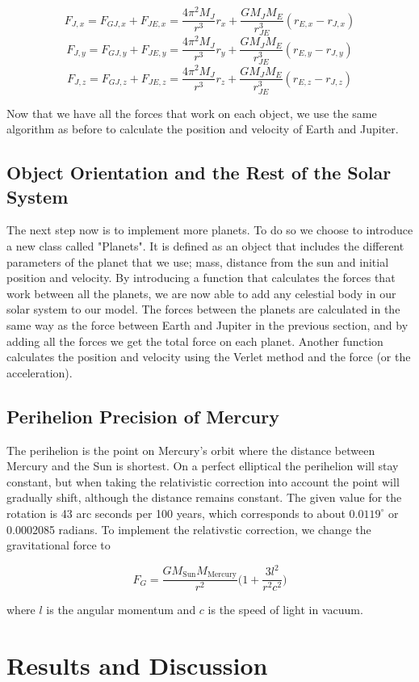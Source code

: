 \documentclass{article}
\begin{document}
$$F_{J,x}=F_{GJ,x}+F_{JE,x}=\frac{4\pi^2M_J}{r^3}r_x+\frac{GM_JM_E}{r_{JE}^3}(r_{E,x}-r_{J,x})$$
$$F_{J,y}=F_{GJ,y}+F_{JE,y}=\frac{4\pi^2M_J}{r^3}r_y+\frac{GM_JM_E}{r_{JE}^3}(r_{E,y}-r_{J,y})$$
$$F_{J,z}=F_{GJ,z}+F_{JE,z}=\frac{4\pi^2M_J}{r^3}r_z+\frac{GM_JM_E}{r_{JE}^3}(r_{E,z}-r_{J,z})$$

Now that we have all the forces that work on each object, we use the same algorithm as before to calculate the position and velocity of Earth and Jupiter.

\subsection{Object Orientation and the Rest of the Solar System}
The next step now is to implement more planets. To do so we choose to introduce a new class called "Planets". It is defined as an object that includes the different parameters of the planet that we use; mass, distance from the sun and initial position and velocity. By introducing a function that calculates the forces that work between all the planets, we are now able to add any celestial body in our solar system to our model. The forces between the planets are calculated in the same way as the force between Earth and Jupiter in the previous section, and by adding all the forces we get the total force on each planet. Another function calculates the position and velocity using the Verlet method and the force (or the acceleration).

\subsection{Perihelion Precision of Mercury}
The perihelion is the point on Mercury's orbit where the distance between Mercury and the Sun is shortest. On a perfect elliptical the perihelion will stay constant, but when taking the relativistic correction into account the point will gradually shift, although the distance remains constant. The given value for the rotation is 43 arc seconds per 100 years, which corresponds to about $0.0119^{\circ}$ or 0.0002085 radians. To implement the relativstic correction, we change the gravitational force to

$$F_G=\frac{GM_{\mathrm{Sun}}M_{\mathrm{Mercury}}}{r^2}\bigg( 1+\frac{3l^2}{r^2c^2}\bigg)$$

where $l$ is the angular momentum and $c$ is the speed of light in vacuum.


\section{Results and Discussion}
\end{document}

